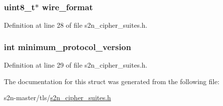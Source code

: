 \subsubsection[{\texorpdfstring{wire\+\_\+format}{wire_format}}]{\setlength{\rightskip}{0pt plus 5cm}uint8\+\_\+t$\ast$ wire\+\_\+format}\hypertarget{structs2n__cipher__preferences_acc56b427760b185ee09b05e370850623}{}\label{structs2n__cipher__preferences_acc56b427760b185ee09b05e370850623}


Definition at line 28 of file s2n\+\_\+cipher\+\_\+suites.\+h.

\subsubsection[{\texorpdfstring{minimum\+\_\+protocol\+\_\+version}{minimum_protocol_version}}]{\setlength{\rightskip}{0pt plus 5cm}int minimum\+\_\+protocol\+\_\+version}\hypertarget{structs2n__cipher__preferences_a98d8055e86b9652d5448a1a82a9f9407}{}\label{structs2n__cipher__preferences_a98d8055e86b9652d5448a1a82a9f9407}


Definition at line 29 of file s2n\+\_\+cipher\+\_\+suites.\+h.



The documentation for this struct was generated from the following file\+:\begin{DoxyCompactItemize}
\item 
s2n-\/master/tls/\hyperlink{s2n__cipher__suites_8h}{s2n\+\_\+cipher\+\_\+suites.\+h}\end{DoxyCompactItemize}
